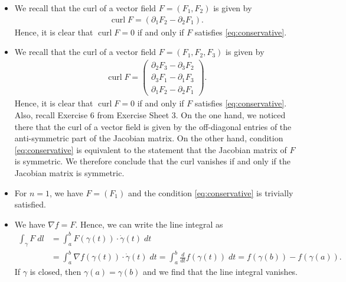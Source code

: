 \documentclass[11pt]{article}
\begin{document}
\begin{solution}
\begin{itemize}
    \item We recall that the curl of a vector field $F = (F_1,F_2)$ is given by
    \begin{align}
        \operatorname{curl} F = \left( \partial_1 F_2 - \partial_2 F_1 \right).
    \end{align}
    Hence, it is clear that $\operatorname{curl} F = 0$ if and only if $F$ satisfies \eqref{eq:conservative}.
    \item We recall that the curl of a vector field $F = (F_1,F_2,F_3)$ is given by
    \begin{align}
        \operatorname{curl} F = 
        \begin{pmatrix}
            \partial_2 F_3 - \partial_3 F_2
            \\
            \partial_3 F_1 - \partial_1 F_3
            \\
            \partial_1 F_2 - \partial_2 F_1
        \end{pmatrix}.
    \end{align}
    Hence, it is clear that $\operatorname{curl} F = 0$ if and only if $F$ satisfies \eqref{eq:conservative}. 
    Also, recall Exercise 6 from Exercise Sheet 3. On the one hand, we noticed there that the curl of a vector field is given by the off-diagonal entries of the
    anti-symmetric part of the Jacobian matrix. On the other hand, condition \eqref{eq:conservative} is equivalent to the statement that the Jacobian matrix of $F$ is symmetric.
    We therefore conclude that the curl vanishes if and only if the Jacobian matrix is symmetric.
    \item For $n=1$, we have $F = (F_1)$ and the condition \eqref{eq:conservative} is trivially satisfied.
    \item We have $\nabla f = F$. Hence, we can write the line integral as
    \begin{align}
        \int_\gamma F \;dl &= \int_a^b F(\gamma(t)) \cdot \dot \gamma(t) \;dt \\
        &= \int_a^b \nabla f(\gamma(t)) \cdot \dot \gamma(t) \;dt = \int_a^b \frac{d}{dt} f(\gamma(t)) \;dt = f(\gamma(b)) - f(\gamma(a)).
    \end{align}
    If $\gamma$ is closed, then $\gamma(a) = \gamma(b)$ and we find that the line integral vanishes.
\end{itemize}
\end{solution}
\end{document}
